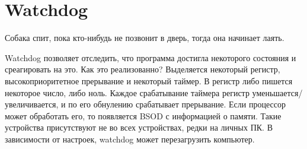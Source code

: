 \documentclass[main]{subfiles}
\begin{document}
\section{Watchdog}
Собака спит, пока кто-нибудь не позвонит в дверь, тогда она начинает лаять.

Watchdog позволяет отследить, что программа достигла некоторого состояния и
среагировать на это. Как это реализованно? Выделяется некоторый регистр,
высокоприоритетное прерывание и некоторый таймер. В регистр либо пишется
некоторое число, либо ноль. Каждое срабатывание таймера регистр уменьшается/
увеличивается, и по его обнулению срабатывает прерывание. Если процессор
может обработать его, то появляется BSOD с информацией о памяти.
Такие устройства присутствуют не во всех устройствах, редки на личных ПК.
В зависимости от настроек, watchdog может перезагрузить компьютер.
\end{document}
